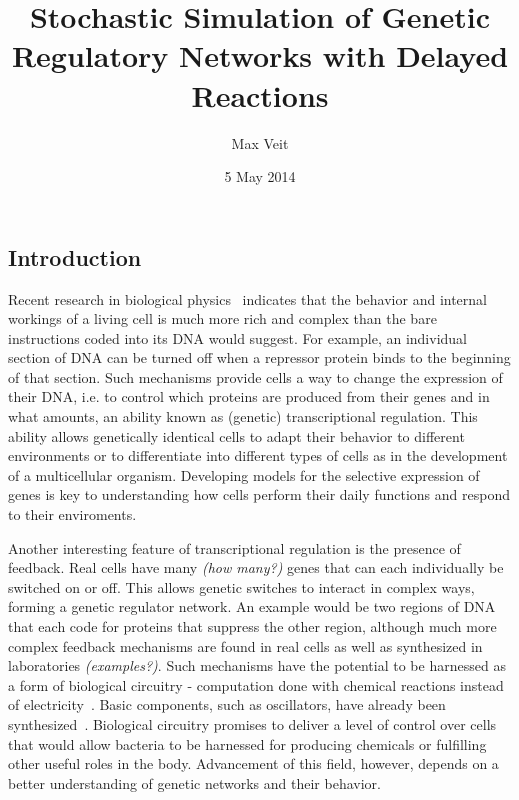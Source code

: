 \documentclass[english,letterpaper,12pt]{article}
\begin{document}
\title{Stochastic Simulation of Genetic Regulatory Networks with Delayed Reactions}
\author{Max Veit}
\date{5 May 2014}

\maketitle

\begin{doublespacing}

\section{Introduction} %
\label{sec:introduction}

Recent research in biological physics~\cite{ecoli-decision} indicates that the behavior and internal workings of a living cell is much more rich and complex than the bare instructions coded into its DNA would suggest. For example, an individual section of DNA can be turned off when a repressor protein binds to the beginning of that section. Such mechanisms provide cells a way to change the expression of their DNA, i.e. to control which proteins are produced from their genes and in what amounts, an ability known as (genetic) transcriptional regulation. This ability allows genetically identical cells to adapt their behavior to different environments or to differentiate into different types of cells as in the development of a multicellular organism. Developing models for the selective expression of genes is key to understanding how cells perform their daily functions and respond to their enviroments.

Another interesting feature of transcriptional regulation is the presence of feedback. Real cells have many \textit{(how many?)} genes that can each individually be switched on or off. This allows genetic switches to interact in complex ways, forming a genetic regulator network. An example would be two regions of DNA that each code for proteins that suppress the other region, although much more complex feedback mechanisms are found in real cells as well as synthesized in laboratories \textit{(examples?)}. Such mechanisms have the potential to be harnessed as a form of biological circuitry - computation done with chemical reactions instead of electricity~\cite{bio-circuits}. Basic components, such as oscillators, have already been synthesized~\cite{synth-osc}. Biological circuitry promises to deliver a level of control over cells that would allow bacteria to be harnessed for producing chemicals or fulfilling other useful roles in the body. Advancement of this field, however, depends on a better understanding of genetic networks and their behavior.


\end{doublespacing}
\end{document}
